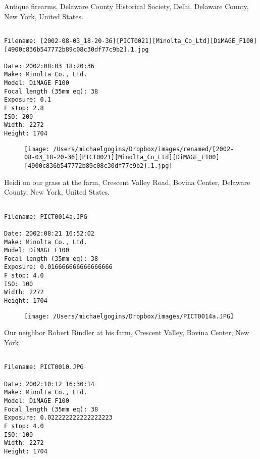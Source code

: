\clearpage
\onecolumn
\noindent Antique firearms, Delaware County Historical Society, Delhi, Delaware County, New York, United States.
\noindent
\begin{lstlisting}

Filename: [2002-08-03_18-20-36][PICT0021][Minolta_Co_Ltd][DiMAGE_F100][4900c836b547772b89c08c30df77c9b2].1.jpg

Date: 2002:08:03 18:20:36
Make: Minolta Co., Ltd.
Model: DiMAGE F100
Focal length (35mm eq): 38
Exposure: 0.1
F stop: 2.8
ISO: 200
Width: 2272
Height: 1704
\end{lstlisting}
\clearpage

\begin{figure}
\texttt{[image: /Users/michaelgogins/Dropbox/images/renamed/[2002-08-03\_18-20-36][PICT0021][Minolta\_Co\_Ltd][DiMAGE\_F100][4900c836b547772b89c08c30df77c9b2].1.jpg]}
\end{figure}
    
\clearpage
\onecolumn
\noindent Heidi on our grass at the farm, Crescent Valley Road, Bovina Center, Delaware County, New York, United States.
\noindent
\begin{lstlisting}

Filename: PICT0014a.JPG

Date: 2002:08:21 16:52:02
Make: Minolta Co., Ltd.
Model: DiMAGE F100
Focal length (35mm eq): 38
Exposure: 0.016666666666666666
F stop: 4.0
ISO: 100
Width: 2272
Height: 1704
\end{lstlisting}
\clearpage

\begin{figure}
\texttt{[image: /Users/michaelgogins/Dropbox/images/PICT0014a.JPG]}
\end{figure}
    
\clearpage
\onecolumn
\noindent Our neighbor Robert Bindler at his farm, Crescent Valley, Bovina Center, New York.
\noindent
\begin{lstlisting}

Filename: PICT0010.JPG

Date: 2002:10:12 16:30:14
Make: Minolta Co., Ltd.
Model: DiMAGE F100
Focal length (35mm eq): 38
Exposure: 0.022222222222222223
F stop: 4.0
ISO: 100
Width: 2272
Height: 1704
\end{lstlisting}
\clearpage

